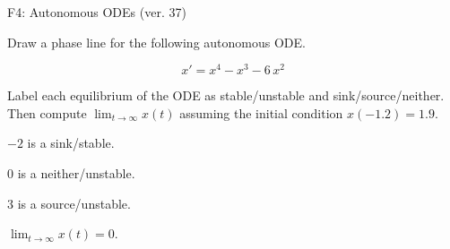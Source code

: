 \begin{exercise}
  \begin{exerciseTitle}F4: Autonomous ODEs (ver. 37)\end{exerciseTitle}
  \begin{exerciseStatement}
    

      Draw a phase line for the following 
      autonomous ODE.
    

    
\[x'= x^{4} - x^{3} - 6 \, x^{2}\]

    

      Label each equilibrium of the ODE
      as stable/unstable and sink/source/neither.
      Then compute \(\lim_{t\to\infty}x(t)\)
      assuming the initial condition
      \(x( -1.2 )= 1.9\).
    

  \end{exerciseStatement}
  \begin{exerciseAnswer}
    

      \(-2\) is a sink/stable.
      
        \(0\) is a neither/unstable.
      
      \(3\) is a source/unstable.
    

    

      \(\lim_{t\to\infty}x(t)=0\).
    

  \end{exerciseAnswer}
\end{exercise}